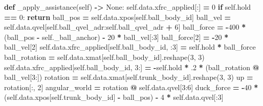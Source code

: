 \documentclass[
  chinese,
  11pt,
  letterpaper,
]{article}
\newenvironment{Shaded}{\begin{snugshade}}{\end{snugshade}}
\newcommand{\ControlFlowTok}[1]{\textcolor[rgb]{0.13,0.29,0.53}{\textbf{#1}}}
\newcommand{\DecValTok}[1]{\textcolor[rgb]{0.00,0.00,0.81}{#1}}
\newcommand{\FloatTok}[1]{\textcolor[rgb]{0.00,0.00,0.81}{#1}}
\newcommand{\KeywordTok}[1]{\textcolor[rgb]{0.13,0.29,0.53}{\textbf{#1}}}
\newcommand{\NormalTok}[1]{#1}
\newcommand{\OperatorTok}[1]{\textcolor[rgb]{0.81,0.36,0.00}{\textbf{#1}}}
\newcommand{\VariableTok}[1]{\textcolor[rgb]{0.00,0.00,0.00}{#1}}
\renewenvironment{Shaded}{\par\smallskip}{\par\smallskip}
\begin{document}
\begin{Shaded}
\begin{Highlighting}[]
    \KeywordTok{def}\NormalTok{ \_apply\_assistance(}\VariableTok{self}\NormalTok{) }\OperatorTok{{-}\textgreater{}} \VariableTok{None}\NormalTok{:}
        \VariableTok{self}\NormalTok{.data.xfrc\_applied[:] }\OperatorTok{=} \DecValTok{0}
        \ControlFlowTok{if} \VariableTok{self}\NormalTok{.hold }\OperatorTok{==} \DecValTok{0}\NormalTok{:}
            \ControlFlowTok{return}
\NormalTok{        ball\_pos }\OperatorTok{=} \VariableTok{self}\NormalTok{.data.xpos[}\VariableTok{self}\NormalTok{.ball\_body\_id]}
\NormalTok{        ball\_vel }\OperatorTok{=} \VariableTok{self}\NormalTok{.data.qvel[}\VariableTok{self}\NormalTok{.ball\_qvel\_adr:}\VariableTok{self}\NormalTok{.ball\_qvel\_adr }\OperatorTok{+} \DecValTok{6}\NormalTok{]}
\NormalTok{        ball\_force }\OperatorTok{=} \OperatorTok{{-}}\DecValTok{400} \OperatorTok{*}\NormalTok{ (ball\_pos }\OperatorTok{{-}} \VariableTok{self}\NormalTok{.\_ball\_anchor) }\OperatorTok{{-}} \DecValTok{20} \OperatorTok{*}\NormalTok{ ball\_vel[:}\DecValTok{3}\NormalTok{]}
\NormalTok{        ball\_force[}\DecValTok{2}\NormalTok{] }\OperatorTok{=} \OperatorTok{{-}}\DecValTok{20} \OperatorTok{*}\NormalTok{ ball\_vel[}\DecValTok{2}\NormalTok{]}
        \VariableTok{self}\NormalTok{.data.xfrc\_applied[}\VariableTok{self}\NormalTok{.ball\_body\_id, :}\DecValTok{3}\NormalTok{] }\OperatorTok{=} \VariableTok{self}\NormalTok{.hold }\OperatorTok{*}\NormalTok{ ball\_force}
\NormalTok{        ball\_rotation }\OperatorTok{=} \VariableTok{self}\NormalTok{.data.xmat[}\VariableTok{self}\NormalTok{.ball\_body\_id].reshape(}\DecValTok{3}\NormalTok{, }\DecValTok{3}\NormalTok{)}
        \VariableTok{self}\NormalTok{.data.xfrc\_applied[}\VariableTok{self}\NormalTok{.ball\_body\_id, }\DecValTok{3}\NormalTok{:] }\OperatorTok{=} \OperatorTok{{-}}\VariableTok{self}\NormalTok{.hold }\OperatorTok{*} \FloatTok{.2} \OperatorTok{*}\NormalTok{ (ball\_rotation }\OperatorTok{@}\NormalTok{ ball\_vel[}\DecValTok{3}\NormalTok{:])}
\NormalTok{        rotation }\OperatorTok{=} \VariableTok{self}\NormalTok{.data.xmat[}\VariableTok{self}\NormalTok{.trunk\_body\_id].reshape(}\DecValTok{3}\NormalTok{, }\DecValTok{3}\NormalTok{)}
\NormalTok{        up }\OperatorTok{=}\NormalTok{ rotation[:, }\DecValTok{2}\NormalTok{]}
\NormalTok{        angular\_world }\OperatorTok{=}\NormalTok{ rotation }\OperatorTok{@} \VariableTok{self}\NormalTok{.data.qvel[}\DecValTok{3}\NormalTok{:}\DecValTok{6}\NormalTok{]}
\NormalTok{        duck\_force }\OperatorTok{=} \OperatorTok{{-}}\DecValTok{40} \OperatorTok{*}\NormalTok{ (}\VariableTok{self}\NormalTok{.data.xpos[}\VariableTok{self}\NormalTok{.trunk\_body\_id] }\OperatorTok{{-}}\NormalTok{ ball\_pos) }\OperatorTok{{-}} \DecValTok{4} \OperatorTok{*} \VariableTok{self}\NormalTok{.data.qvel[:}\DecValTok{3}\NormalTok{]}

\end{Highlighting}
\end{Shaded}
\end{document}
